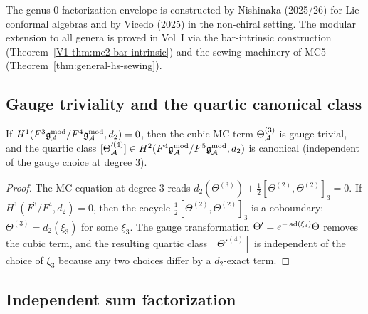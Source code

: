 \begin{remark}
The genus-$0$ factorization envelope is constructed by Nishinaka
(2025/26) for Lie conformal algebras and by Vicedo (2025) in the
non-chiral setting. The modular extension to all genera is
proved in Vol~I via the bar-intrinsic construction
(Theorem~\ref*{V1-thm:mc2-bar-intrinsic}) and the sewing machinery
of MC5 (Theorem~\ref{thm:general-hs-sewing}).
\end{remark}


\subsection{Gauge triviality and the quartic canonical class}

\begin{theorem}
\label{thm:cubic-gauge-triviality}
If $H^1(F^3\mathfrak{g}_{\mathcal{A}}^{\mathrm{mod}} / F^4\mathfrak{g}_{\mathcal{A}}^{\mathrm{mod}}, d_2) = 0$, then the cubic MC
term $\Theta_{\mathcal{A}}^{(3)}$ is gauge-trivial, and the quartic class
$[\Theta'^{(4)}_{\mathcal{A}}] \in H^2(F^4\mathfrak{g}_{\mathcal{A}}^{\mathrm{mod}} / F^5\mathfrak{g}_{\mathcal{A}}^{\mathrm{mod}}, d_2)$ is
canonical (independent of the gauge choice at degree $3$).
\end{theorem}

\begin{proof}
The MC equation at degree $3$ reads
$d_2(\Theta^{(3)}) + \frac{1}{2}[\Theta^{(2)}, \Theta^{(2)}]_3 = 0$.
If $H^1(F^3/F^4, d_2) = 0$, then the cocycle
$\frac{1}{2}[\Theta^{(2)}, \Theta^{(2)}]_3$ is a coboundary:
$\Theta^{(3)} = d_2(\xi_3)$ for some $\xi_3$. The gauge
transformation $\Theta' = e^{-\operatorname{ad}(\xi_3)}\Theta$ removes the
cubic term, and the resulting quartic class $[\Theta'^{(4)}]$ is
independent of the choice of $\xi_3$ because any two choices differ
by a $d_2$-exact term.
\end{proof}


\subsection{Independent sum factorization}

